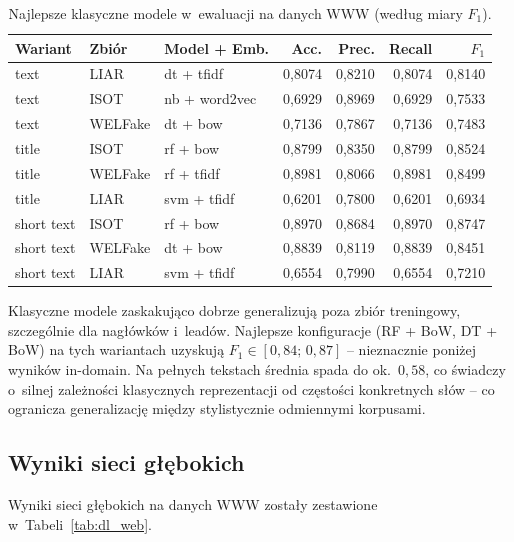 \documentclass[oneside,polski,logo]{amuthesis}
\begin{document}
\begin{table}[ht]
\centering
\caption{Najlepsze klasyczne modele w~ewaluacji na danych WWW
(według miary $F_1$).}
\label{tab:klas_web}
\begin{tabular}{lllrrrr}
\toprule
Wariant & Zbiór & Model + Emb. & Acc. & Prec. & Recall & $F_1$ \\
\midrule
text       & LIAR    & dt + tfidf      & 0,8074 & 0,8210 & 0,8074 & 0,8140 \\
text       & ISOT    & nb + word2vec   & 0,6929 & 0,8969 & 0,6929 & 0,7533 \\
text       & WELFake & dt + bow        & 0,7136 & 0,7867 & 0,7136 & 0,7483 \\
title      & ISOT    & rf + bow        & 0,8799 & 0,8350 & 0,8799 & 0,8524 \\
title      & WELFake & rf + tfidf      & 0,8981 & 0,8066 & 0,8981 & 0,8499 \\
title      & LIAR    & svm + tfidf     & 0,6201 & 0,7800 & 0,6201 & 0,6934 \\
short text & ISOT    & rf + bow        & 0,8970 & 0,8684 & 0,8970 & 0,8747 \\
short text & WELFake & dt + bow        & 0,8839 & 0,8119 & 0,8839 & 0,8451 \\
short text & LIAR    & svm + tfidf     & 0,6554 & 0,7990 & 0,6554 & 0,7210 \\
\bottomrule
\end{tabular}
\end{table}

Klasyczne modele zaskakująco dobrze generalizują poza zbiór
treningowy, szczególnie dla nagłówków i~leadów. Najlepsze konfiguracje
(RF + BoW, DT + BoW) na tych wariantach uzyskują
\(F_1 \in [0{,}84;\,0{,}87]\) -- nieznacznie poniżej wyników in-domain.
Na pełnych tekstach średnia spada do ok.\ \(0{,}58\), co świadczy
o~silnej zależności klasycznych reprezentacji od częstości konkretnych
słów -- co ogranicza generalizację między stylistycznie odmiennymi
korpusami.

\subsection{Wyniki sieci głębokich}
\label{sec:wyniki_www_glebokie}

Wyniki sieci głębokich na danych WWW zostały zestawione
w~Tabeli~\ref{tab:dl_web}.
\end{document}

